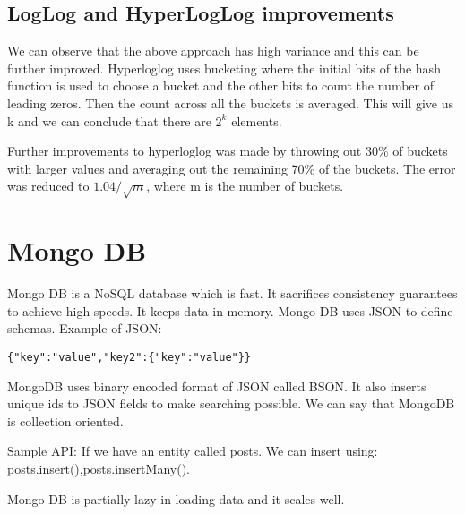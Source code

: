 \documentclass[twoside]{article}
\begin{document}
\subsection{LogLog and HyperLogLog improvements}

We can observe that the above approach has high variance and this can be further improved. Hyperloglog uses bucketing where the initial bits of the hash function is used to choose a bucket and the other bits to count the number of leading zeros. Then the count across all the buckets is averaged. This will give us k and we can conclude that there are $2^k$ elements. 
\par

Further improvements to hyperloglog was made by throwing out 30\% of buckets with larger values and averaging out the remaining 70\% of the buckets. The error was reduced to $1.04/ \sqrt{m} $, where m is the number of buckets. 


\section{Mongo DB}
Mongo DB is a NoSQL database which is fast. It sacrifices consistency guarantees to achieve high speeds. It keeps data in memory. Mongo DB uses JSON to define schemas. Example of JSON:
\begin{lstlisting}
{"key":"value","key2":{"key":"value"}}
\end{lstlisting}
\par
MongoDB uses binary encoded format of JSON called BSON. It also inserts unique ids to JSON fields to make searching possible. We can say that MongoDB is collection oriented. 
\par
Sample API: 
If we have an entity called posts. We can insert using:
posts.insert(),posts.insertMany(). 
\par
Mongo DB is partially lazy in loading data and it scales well. 
\end{document}

